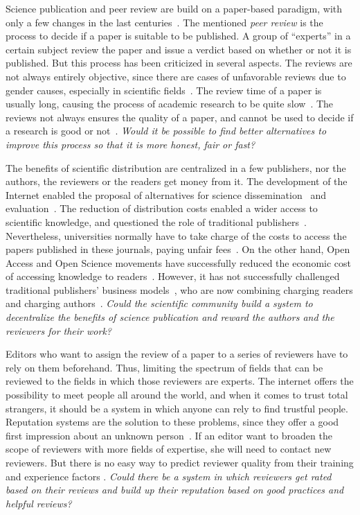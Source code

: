 Science publication and peer review are build on a paper-based paradigm, with
only a few changes in the last centuries~\cite{spier2002history}. The mentioned
\emph{peer review} is the process to decide if a paper is suitable to be
published. A group of ``experts'' in a certain subject review the paper and
issue a verdict based on whether or not it is published. But this process has
been criticized in several aspects. The reviews are not always entirely
objective, since there are cases of unfavorable reviews due to gender causes,
especially in scientific fields~\cite{wenneras2001nepotism}. The review time of
a paper is usually long, causing the process of academic research to be quite
slow~\cite{huisman2017duration}. The reviews not always ensures the quality of a
paper, and cannot be used to decide if a research is good or
not~\cite{goldbeck1999evidence}. \emph{Would it be possible to find better
  alternatives to improve this process so that it is more honest, fair or fast?}

The benefits of scientific distribution are centralized in a few publishers, nor
the authors, the reviewers or the readers get money from it. The development of
the Internet enabled the proposal of alternatives for science
dissemination~\cite{eysenbach2006citation} and
evaluation~\cite{walker_emerging_2015}. The reduction of distribution costs
enabled a wider access to scientific knowledge, and questioned the role of
traditional publishers~\cite{ReinventingRigor}. Nevertheless, universities
normally have to take charge of the costs to access the papers published in
these journals, paying unfair fees~\cite{bergstrom2004costs}. On the other hand,
Open Access and Open Science movements have successfully reduced the economic
cost of accessing knowledge to readers~\cite{evans2009open}. However, it has not
successfully challenged traditional publishers' business
models~\cite{lariviere2015oligopoly}, who are now combining charging readers and
charging authors~\cite{van2013true}. \emph{Could the scientific community build
  a system to decentralize the benefits of science publication and reward the
  authors and the reviewers for their work?}

Editors who want to assign the review of a paper to a series of reviewers have
to rely on them beforehand. Thus, limiting the spectrum of fields that can be
reviewed to the fields in which those reviewers are experts. The internet offers
the possibility to meet people all around the world, and when it comes to trust
total strangers, it should be a system in which anyone can rely to find trustful
people. Reputation systems are the solution to these problems, since they offer
a good first impression about an unknown person~\cite{resnick2000reputation}. If
an editor want to broaden the scope of reviewers with more fields of expertise,
she will need to contact new reviewers. But there is no easy way to predict
reviewer quality from their training and experience factors
\cite{callaham_relationship_2007}. \emph{Could there be a system in which
  reviewers get rated based on their reviews and build up their reputation based
  on good practices and helpful reviews?}

